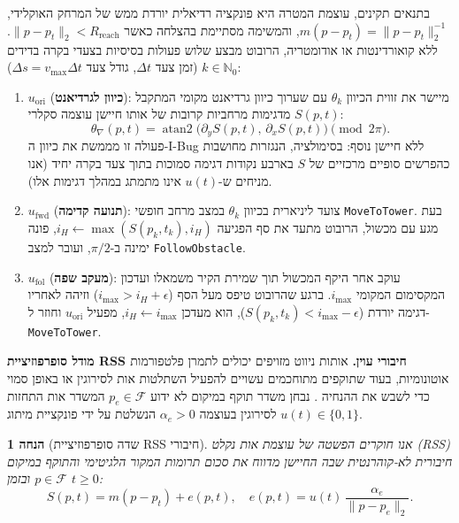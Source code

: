 \documentclass[10pt, a4paper, twocolumn]{article}
\newtheorem{assumption}{הנחה}
\begin{document}
בתנאים תקינים, עוצמת המטרה היא פונקציה רדיאלית יורדת ממש של המרחק האוקלידי, $m(p - p_t) = \|p - p_t\|_2^{-1}$, והמשימה מסתיימת בהצלחה כאשר $\|p - p_t\|_2 < R_{\text{reach}}$. ללא קואורדינטות או אודומטריה, הרובוט מבצע שלוש פעולות בסיסיות בצעדי בקרה בדידים $k \in \mathbb{N}_0$ (זמן צעד $\Delta t$, גודל צעד $\Delta s = v_{\max}\Delta t$):
\begin{enumerate}
    \item $u_{\text{ori}}$ (\textbf{כיוון לגרדיאנט}): מיישר את זווית הכיוון $\theta_k$ עם שערוך כיוון גרדיאנט מקומי המתקבל מדגימות מרחביות קרובות של אותו חיישן עוצמה סקלרי $S(p, t)$:
    \begin{equation}
        \theta_{\nabla}(p, t) = \operatorname{atan2}\!\bigl(\partial_y S(p, t),\, \partial_x S(p, t)\bigr) \pmod{2\pi}.
        \label{eq:grad_angle}
    \end{equation}
    פעולה זו מממשת את כיוון ה-\foreignlanguage{english}{I-Bug} ללא חיישן נוסף: בסימולציה, הנגזרות מחושבות כהפרשים סופיים מרכזיים של $S$ בארבע נקודות דגימה סמוכות בתוך צעד בקרה יחיד (אנו מניחים ש-$u(t)$ אינו מתמתג במהלך דגימות אלו).
    \item $u_{\text{fwd}}$ (\textbf{תנועה קדימה}): צועד ליניארית בכיוון $\theta_k$ במצב מרחב חופשי \foreignlanguage{english}{\texttt{MoveToTower}}. בעת מגע עם מכשול, הרובוט מתעד את סף הפגיעה $i_H \leftarrow \max(S(p_k, t_k), i_H)$, פונה ימינה ב-$\pi/2$, ועובר למצב \foreignlanguage{english}{\texttt{FollowObstacle}}.
    \item $u_{\text{fol}}$ (\textbf{מעקב שפה}): עוקב אחר היקף המכשול תוך שמירת הקיר משמאלו ועדכון המקסימום המקומי $i_{\text{max}}$. ברגע שהרובוט טיפס מעל הסף ($i_{\text{max}} > i_H + \epsilon$) וזיהה לאחריו דגימה יורדת ($S(p_k, t_k) < i_{\text{max}} - \epsilon$), הוא מעדכן $i_H \leftarrow i_{\text{max}}$, מפעיל $u_{\text{ori}}$ וחוזר ל-\foreignlanguage{english}{\texttt{MoveToTower}}.
\end{enumerate}

\noindent\textbf{מודל סופרפוזיציית \foreignlanguage{english}{RSS} חיבורי עוין.}
אותות ניווט מזויפים יכולים לתמרן פלטפורמות אוטונומיות, בעוד שתוקפים מתוחכמים עשויים להפעיל השתלטות אות לסירוגין או באופן סמוי כדי לשבש את ההנחיה \cite{kerns2014unmanned, psiaki2016gnss}. נבחן משדר תוקף במיקום לא ידוע $p_e \in \mathcal{F}$ המשדר אות התחזות לסירוגין בעוצמה $\alpha_e > 0$ הנשלטת על ידי פונקציית מיתוג $u(t) \in \{0, 1\}$.

\begin{assumption}[שדה סופרפוזיציית \foreignlanguage{english}{RSS} חיבורי]
\label{assump:superposition}
אנו חוקרים הפשטה של עוצמת אות נקלט (\foreignlanguage{english}{RSS}) חיבורית לא-קוהרנטית שבה החיישן מדווח את סכום תרומות המקור הלגיטימי והתוקף במיקום $p \in \mathcal{F}$ ובזמן $t \ge 0$:
\begin{equation}
    S(p, t) = m(p - p_t) + e(p, t), \quad e(p, t) = u(t)\,\frac{\alpha_e}{\|p - p_e\|_2}.
    \label{eq:superposition}
\end{equation}
\end{assumption}
\end{document}
